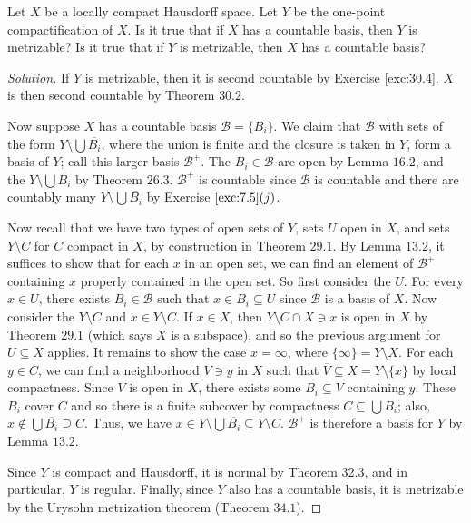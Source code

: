 \documentclass[12pt]{article}
\theoremstyle{remark}
\begin{document}
\setcounter{subsubsection}{4}
\begin{problem}
  Let $X$ be a locally compact Hausdorff space. Let $Y$ be the one-point compactification of $X$. Is it true that if $X$ has a countable basis, then $Y$ is metrizable? Is it true that if $Y$ is metrizable, then $X$ has a countable basis?
\end{problem}
\begin{proof}[Solution]
  If $Y$ is metrizable, then it is second countable by Exercise \ref{exc:30.4}. $X$ is then second countable by Theorem $30.2$.
  \par Now suppose $X$ has a countable basis $\mathcal{B} = \{B_i\}$. We claim
  that $\mathcal{B}$ with sets of the form $Y \setminus \bigcup \overline{B_i}$,
  where the union is finite and the closure is taken in $Y$, form a basis of
  $Y$; call this larger basis $\mathcal{B}^+$. The $B_i \in \mathcal{B}$ are
  open by Lemma $16.2$, and the $Y \setminus \bigcup \overline{B_i}$ by Theorem
  $26.3$. $\mathcal{B}^+$ is countable since $\mathcal{B}$ is countable and
  there are countably many $Y \setminus \bigcup \overline{B_i}$ by Exercise
  $\ref{exc:7.5}(j)$.
  \par Now recall that we have two types of open sets of $Y$, sets $U$ open in
  $X$, and sets $Y \setminus C$ for $C$ compact in $X$, by construction in
  Theorem $29.1$. By Lemma $13.2$, it suffices to show that for each $x$ in an
  open set, we can find an element of $\mathcal{B}^+$ containing $x$ properly contained in the open set. So first consider the $U$. For every $x \in U$, there exists $B_i \in \mathcal{B}$ such that $x \in B_i \subseteq U$ since $\mathcal{B}$ is a basis of $X$. Now consider the $Y \setminus C$ and $x \in Y \setminus C$. If $x \in X$, then $Y \setminus C \cap X \ni x$ is open in $X$ by Theorem $29.1$ (which says $X$ is a subspace), and so the previous argument for $U \subseteq X$ applies. It remains to show the case $x = \infty$, where $\{\infty\} = Y \setminus X$. For each $y \in C$, we can find a neighborhood $V \ni y$ in $X$ such that $\overline{V} \subseteq X = Y \setminus \{x\}$ by local compactness. Since $V$ is open in $X$, there exists some $B_i \subseteq V$ containing $y$. These $B_i$ cover $C$ and so there is a finite subcover by compactness $C \subseteq \bigcup B_i$; also, $x \notin \bigcup \overline{B_i} \supseteq C$. Thus, we have $x \in Y \setminus \bigcup \overline{B_i} \subseteq Y \setminus C$. $\mathcal{B}^+$ is therefore a basis for $Y$ by Lemma $13.2$.
  \par Since $Y$ is compact and Hausdorff, it is normal by Theorem 32.3, and
  in particular, $Y$ is regular. Finally, since $Y$ also has a countable basis, it is metrizable by the Urysohn metrization theorem (Theorem $34.1$).
\end{proof}
\end{document}
